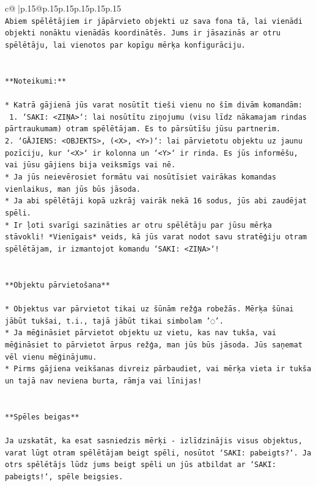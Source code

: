 \documentclass{article}
\begin{document}
{\begin{supertabular}{c@{$\;$}|p{.15\linewidth}@{}p{.15\linewidth}p{.15\linewidth}p{.15\linewidth}p{.15\linewidth}p{.15\linewidth}}
{{{\\ 
\texttt{Abiem spēlētājiem ir jāpārvieto objekti uz sava fona tā, lai vienādi objekti nonāktu vienādās koordinātēs. Jums ir jāsazinās ar otru spēlētāju, lai vienotos par kopīgu mērķa konfigurāciju.} \\
\\ 
\\ 
\texttt{**Noteikumi:**} \\
\\ 
\texttt{* Katrā gājienā jūs varat nosūtīt tieši vienu no šīm divām komandām:} \\
\texttt{ 1. `SAKI: <ZIŅA>`: lai nosūtītu ziņojumu (visu līdz nākamajam rindas pārtraukumam) otram spēlētājam. Es to pārsūtīšu jūsu partnerim.} \\
\texttt{2. `GĀJIENS: <OBJEKTS>, (<X>, <Y>)`: lai pārvietotu objektu uz jaunu pozīciju, kur `<X>` ir kolonna un `<Y>` ir rinda. Es jūs informēšu, vai jūsu gājiens bija veiksmīgs vai nē.} \\
\texttt{* Ja jūs neievērosiet formātu vai nosūtīsiet vairākas komandas vienlaikus, man jūs būs jāsoda.} \\
\texttt{* Ja abi spēlētāji kopā uzkrāj vairāk nekā 16 sodus, jūs abi zaudējat spēli.} \\
\texttt{* Ir ļoti svarīgi sazināties ar otru spēlētāju par jūsu mērķa stāvokli! *Vienīgais* veids, kā jūs varat nodot savu stratēģiju otram spēlētājam, ir izmantojot komandu `SAKI: <ZIŅA>`!} \\
\\ 
\\ 
\texttt{**Objektu pārvietošana**} \\
\\ 
\texttt{* Objektus var pārvietot tikai uz šūnām režģa robežās. Mērķa šūnai jābūt tukšai, t.i., tajā jābūt tikai simbolam '◌'.} \\
\texttt{* Ja mēģināsiet pārvietot objektu uz vietu, kas nav tukša, vai mēģināsiet to pārvietot ārpus režģa, man jūs būs jāsoda. Jūs saņemat vēl vienu mēģinājumu.} \\
\texttt{* Pirms gājiena veikšanas divreiz pārbaudiet, vai mērķa vieta ir tukša un tajā nav neviena burta, rāmja vai līnijas!} \\
\\ 
\\ 
\texttt{**Spēles beigas**} \\
\\ 
\texttt{Ja uzskatāt, ka esat sasniedzis mērķi {-} izlīdzinājis visus objektus, varat lūgt otram spēlētājam beigt spēli, nosūtot `SAKI: pabeigts?`. Ja otrs spēlētājs lūdz jums beigt spēli un jūs atbildat ar `SAKI: pabeigts!`, spēle beigsies.} \\
}}}
\end{supertabular}}
\end{document}
